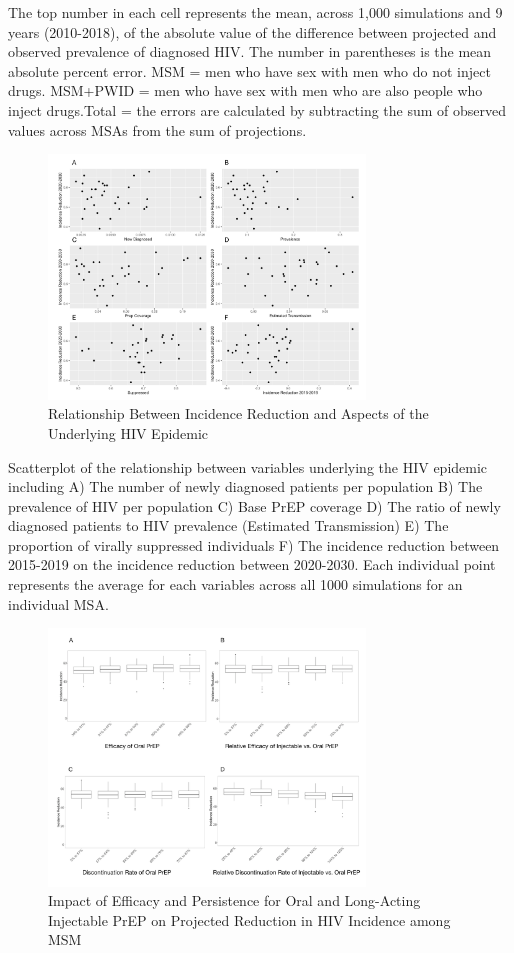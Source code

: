 \documentclass{article}
\begin{document}
The top number in each cell represents the mean, across 1,000 simulations and 9 years (2010-2018), of the absolute value of the difference between projected and observed prevalence of diagnosed HIV. The number in parentheses is the mean absolute percent error. \dag MSM = men who have sex with men who do not inject drugs. MSM+PWID = men who have sex with men who are also people who inject drugs.Total = the errors are calculated by subtracting the sum of observed values across MSAs from the sum of projections.

\begin{figure}[H]
	\centering
	\caption{Relationship Between Incidence Reduction and Aspects of the Underlying HIV Epidemic}
	\includegraphics[width=0.75\textwidth]{images/FigureS4}
\end{figure}

Scatterplot of the relationship between variables underlying the HIV epidemic including A)  The number of newly diagnosed patients per population B) The prevalence of HIV per population C) Base PrEP coverage D) The ratio of newly diagnosed patients to HIV prevalence (Estimated Transmission) E) The proportion of virally suppressed individuals F) The incidence reduction between 2015-2019 on the incidence reduction between 2020-2030. Each individual point represents the average for each variables across all 1000 simulations for an individual MSA. 


\begin{figure}[H]
	\centering
	\caption{Impact of Efficacy and Persistence for Oral and Long-Acting Injectable PrEP on Projected Reduction in HIV Incidence among MSM}
	\includegraphics[width=0.75\textwidth]{images/FigureS5}
\end{figure}
\end{document}
